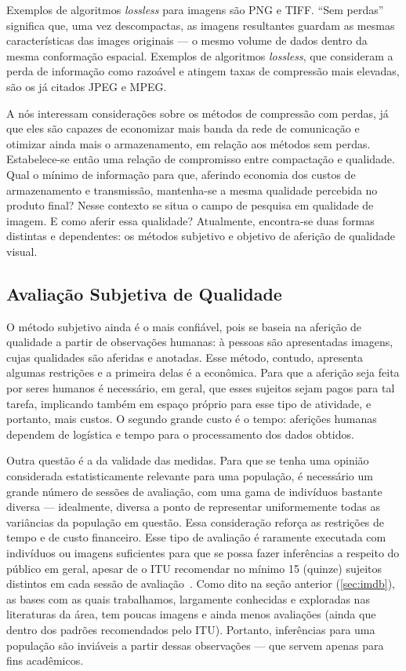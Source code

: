 Exemplos de algoritmos \emph{lossless} para imagens são PNG e TIFF. ``Sem perdas'' significa que, uma vez descompactas, as imagens resultantes guardam as mesmas características das images originais --- o mesmo volume de dados dentro da mesma conformação espacial. Exemplos de algoritmos \emph{lossless}, que consideram a perda de informação como razoável e atingem taxas de compressão mais elevadas, são os já citados JPEG e MPEG.

A nós interessam considerações sobre os métodos de compressão com perdas, já que eles são capazes de economizar mais banda da rede de comunicação e otimizar ainda mais o armazenamento, em relação aos métodos sem perdas. Estabelece-se então uma relação de compromisso entre compactação e qualidade. Qual o mínimo de informação para que, aferindo economia dos custos de armazenamento e transmissão, mantenha-se a mesma qualidade percebida no produto final? Nesse contexto se situa o campo de pesquisa em qualidade de imagem. E como aferir essa qualidade? Atualmente, encontra-se duas formas distintas e dependentes: os métodos subjetivo e objetivo de aferição de qualidade visual.

\subsection{Avaliação Subjetiva de Qualidade}\label{sec:avSub}

	O método subjetivo ainda é o mais confiável, pois se baseia na aferição de qualidade a partir de observações humanas: à pessoas são apresentadas imagens, cujas qualidades são aferidas e anotadas. Esse método, contudo, apresenta algumas restrições e a primeira delas é a econômica. Para que a aferição seja feita por seres humanos é necessário, em geral, que esses sujeitos sejam pagos para tal tarefa, implicando também em espaço próprio para esse tipo de atividade, e portanto, mais custos. O segundo grande custo é o tempo: aferições humanas dependem de logística e tempo para o processamento dos dados obtidos.

	Outra questão é a da validade das medidas. Para que se tenha uma opinião considerada estatisticamente relevante para uma população, é necessário um grande número de sessões de avaliação, com uma gama de indivíduos bastante diversa --- idealmente, diversa a ponto de representar uniformemente todas as variâncias da população em questão. Essa consideração reforça as restrições de tempo e de custo financeiro. Esse tipo de avaliação é raramente executada com indivíduos ou imagens suficientes para que se possa fazer inferências a respeito do público em geral, apesar de o ITU recomendar no mínimo 15 (quinze) sujeitos distintos em cada sessão de avaliação~\cite[p.08]{itur2012}. Como dito na seção anterior (\autoref{sec:imdb}), as bases com as quais trabalhamos, largamente conhecidas e exploradas nas literaturas da área, tem poucas imagens e ainda menos avaliações (ainda que dentro dos padrões recomendados pelo ITU). Portanto, inferências para uma população são inviáveis a partir dessas observações --- que servem apenas para fins acadêmicos.

